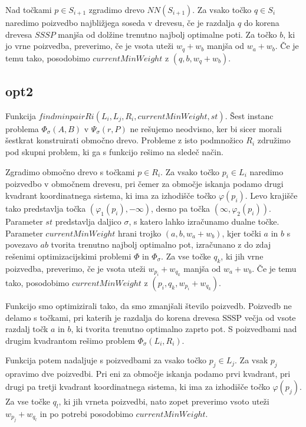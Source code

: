 \documentclass[a4paper, 12pt]{book}
\begin{document}
Nad točkami $p\in S_{i+1}$ zgradimo drevo $NN(S_{i+1})$. Za vsako točko $q\in S_i$ naredimo poizvedbo najbližjega soseda v drevesu, če je razdalja $q$ do korena drevesa $SSSP$ manjša od dolžine trenutno najbolj optimalne poti. Za točko $b$, ki jo vrne poizvedba, preverimo, če je vsota uteži $w_q + w_b$ manjša od $w_a+w_b$. Če je temu tako, posodobimo $currentMinWeight$ z $(q, b, w_q + w_b)$.

\subsection{opt2}
Funkcija $findminpairRi (L_i, L_j, R_i, currentMinWeight, st)$. Šest instanc problema $\Phi_\sigma(A,B)$ v $\Psi_\sigma(r,P)$ ne rešujemo neodvisno, ker bi sicer morali šestkrat konstruirati območno drevo. Probleme z isto podmnožico $R_i$ združimo pod skupni problem, ki ga s funkcijo rešimo na sledeč način.

Zgradimo območno drevo s točkami $p\in R_i$. Za vsako točko $p_i\in L_i$ naredimo poizvedbo v območnem drevesu, pri čemer za območje iskanja podamo  drugi kvadrant koordinatnega sistema, ki ima za izhodišče točko $\varphi (p_i)$. Levo krajišče tako predstavlja točka $(\varphi_1 (p_i), -\infty)$, desno pa točka $(\infty, \varphi_2 (p_i))$. Parameter $st$ predstavlja daljico $\sigma$, s katero lahko izračunamo dualne točke. Parameter $currentMinWeight$ hrani trojko $(a, b, w_a + w_b)$, kjer točki $a$ in $b$ s povezavo $ab$ tvorita trenutno najbolj optimalno pot, izračunano z do zdaj rešenimi optimizacijskimi problemi $\Phi$ in $\Phi_\sigma$. Za vse točke $q_k$, ki jih vrne poizvedba, preverimo, če je vsota uteži $w_{p_i} + w_{q_k}$ manjša od $w_a+w_b$. Če je temu tako, posodobimo $currentMinWeight$ z $(p_i, q_k, w_{p_i} + w_{q_k})$. 

Funkcijo smo optimizirali tako, da smo zmanjšali število poizvedb. Poizvedb ne delamo s točkami, pri katerih je razdalja do korena drevesa SSSP večja od vsote razdalj točk $a$ in $b$, ki tvorita trenutno optimalno zaprto pot. S poizvedbami nad drugim kvadrantom rešimo problem $\Phi_\sigma(L_i,R_i)$.

Funkcija potem nadaljuje s poizvedbami za vsako točko $p_j\in L_j$. Za vsak $p_j$ opravimo dve poizvedbi. Pri eni za območje iskanja podamo prvi kvadrant, pri drugi pa tretji kvadrant koordinatnega sistema, ki ima za izhodišče točko $\varphi (p_j)$. Za vse točke $q_l$, ki jih vrneta poizvedbi, nato zopet preverimo vsoto uteži $w_{p_j} + w_{q_l}$ in po potrebi posodobimo $currentMinWeight$.
\end{document}
